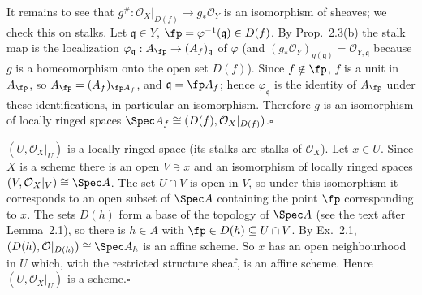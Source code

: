 \documentclass[11pt]{article}
\begin{document}
It remains to see that $g^\#:\mathcal O_X|_{D(f)}\to g_*\mathcal O_Y$ is an isomorphism of sheaves; we check this on stalks. Let $\mathfrak q\in Y$, $\fp=\varphi^{-1}(\mathfrak q)\in D(f)$. By Prop.~2.3(b) the stalk map is the localization $\varphi_{\mathfrak q}:A_\fp\to(A_f)_{\mathfrak q}$ of $\varphi$ (and $(g_*\mathcal O_Y)_{g(\mathfrak q)}=\mathcal O_{Y,\mathfrak q}$ because $g$ is a homeomorphism onto the open set $D(f)$). Since $f\notin\fp$, $f$ is a unit in $A_\fp$, so $A_\fp=(A_f)_{\fp A_f}$, and $\mathfrak q=\fp A_f$; hence $\varphi_{\mathfrak q}$ is the identity of $A_\fp$ under these identifications, in particular an isomorphism. Therefore $g$ is an isomorphism of locally ringed spaces $\Spec A_f\cong(D(f),\mathcal O_X|_{D(f)})$.\hfill$\square$

\pf
$(U,\mathcal O_X|_U)$ is a locally ringed space (its stalks are stalks of $\mathcal O_X$). Let $x\in U$. Since $X$ is a scheme there is an open $V\ni x$ and an isomorphism of locally ringed spaces $(V,\mathcal O_X|_V)\cong\Spec A$. The set $U\cap V$ is open in $V$, so under this isomorphism it corresponds to an open subset of $\Spec A$ containing the point $\fp$ corresponding to $x$. The sets $D(h)$ form a base of the topology of $\Spec A$ (see the text after Lemma~2.1), so there is $h\in A$ with $\fp\in D(h)\subseteq U\cap V$. By Ex.~2.1, $(D(h),\mathcal O|_{D(h)})\cong\Spec A_h$ is an affine scheme. So $x$ has an open neighbourhood in $U$ which, with the restricted structure sheaf, is an affine scheme. Hence $(U,\mathcal O_X|_U)$ is a scheme.\hfill$\square$
\end{document}
